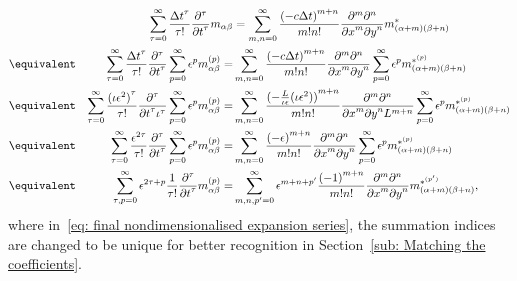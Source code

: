 \begin{alignat}{3}
  \nonumber
  &&\sum_{\tau = 0}^\infty \frac{{\Delta t}^\tau }{\tau!} \frac{\partial^\tau}{{\partial t}^\tau} m_{\alpha\beta} &=
 \sum_{m,n = 0}^\infty \frac{{(- c\Delta t)}^{m+n}} {m!n!} \frac{\partial^m \partial^n}{ {\partial x}^m{\partial y}^n} m^*_{(\alpha + m)(\beta + n)}\\
  \nonumber
  &\equivalent& \sum_{\tau = 0}^\infty \frac{{\Delta t}^\tau }{\tau!}  \frac{\partial^\tau}{{\partial t}^\tau} \sum_{p=0}^{\infty} \epsilon^p m_{\alpha\beta}^{(p)}
    = &{}\sum_{m,n = 0}^\infty \frac{{(-c\Delta t)}^{m+n}} {m!n!} \frac{\partial^m \partial^n}{ {\partial x}^m{\partial y}^n} \sum_{p=0}^{\infty} \epsilon^p m_{(\alpha + m)(\beta + n)}^{*^{(p)}}
  \\
    \label{eq: nondimensionalised expansion series}
  &\equivalent&
    \sum_{\tau = 0}^\infty \frac{{(\iota\epsilon^2)}^\tau }{\tau!} \frac{\partial^\tau}{{\partial t}^\tau \iota^\tau} \sum_{p=0}^{\infty} \epsilon^p m_{\alpha\beta}^{(p)}
    = &{}\sum_{m,n = 0}^\infty \frac{{(-\frac{L}{\iota\epsilon}(\iota\epsilon^2))}^{m+n}} {m!n!}
    \frac{\partial^m \partial^n}{ {\partial x}^m{\partial y}^n L^{m+n}} \sum_{p=0}^{\infty} \epsilon^p m_{(\alpha + m)(\beta + n)}^{*^{(p)}}
   \\
  \nonumber
  &\equivalent&
    \sum_{\tau = 0}^\infty \frac{\epsilon^{2\tau} }{\tau!} \frac{\partial^\tau}{{\partial t}^\tau} \sum_{p=0}^{\infty} \epsilon^p m_{\alpha\beta}^{(p)}
    = &{}\sum_{m,n = 0}^\infty \frac{{(-\epsilon)}^{m+n}} {m!n!}
    \frac{\partial^m \partial^n}{ {\partial x}^m{\partial y}^n } \sum_{p=0}^{\infty} \epsilon^p m_{(\alpha + m)(\beta + n)}^{*^{(p)}}
   \\
    \label{eq: final nondimensionalised expansion series}
  &\equivalent&
    \sum_{\tau, p = 0}^\infty\epsilon^{2\tau + p} \frac{1} {\tau!} \frac{\partial^\tau}{{\partial t}^\tau} m_{\alpha\beta}^{(p)}
    = &{} \sum_{m,n,p' = 0}^\infty  \epsilon^{m+n+p'} \frac{{(-1)}^{m+n}} {m!n!}
    \frac{\partial^m \partial^n}{ {\partial x}^m{\partial y}^n } m_{(\alpha + m)(\beta + n)}^{*^{(p')}},
\end{alignat}
where in~\eqref{eq: final nondimensionalised expansion series}, the summation indices are changed to be unique for better recognition in Section~\ref{sub: Matching the coefficients}.

